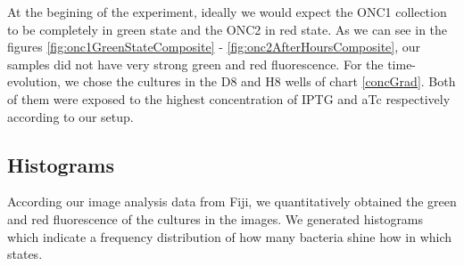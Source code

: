 \documentclass[11pt]{book}
\begin{document}
At the begining of the experiment, ideally we would expect the ONC1 collection to be completely in green state and the ONC2 in red state. As we can see in the figures \ref{fig:onc1GreenStateComposite} - \ref{fig:onc2AfterHoursComposite}, our samples did not have very strong green and red fluorescence. For the time-evolution, we chose the cultures in the D8 and H8 wells of chart \ref{concGrad}. Both of them were exposed to the highest concentration of IPTG and aTc respectively according to our setup. 

\subsection{Histograms}
According our image analysis data from Fiji, we quantitatively obtained the green and red fluorescence of the cultures in the images. We generated histograms which indicate a frequency distribution of how many bacteria shine how in which states. 
\end{document}
